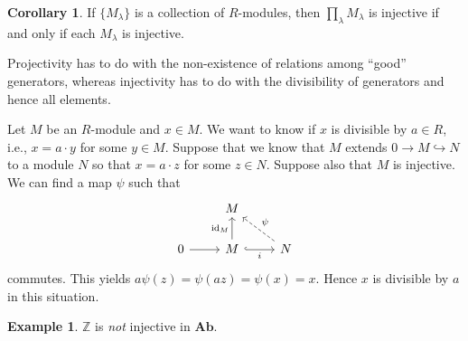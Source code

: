 \documentclass[10pt,letterpaper,cm]{nupset}
\theoremstyle{definition}
\newtheorem{exmp}[definition]{Example}
\theoremstyle{theorem}
\newtheorem{corollary}[definition]{Corollary}
\theoremstyle{remark}
\newcommand{\Z}{\mathbb Z}
\newcommand{\1}{\mathbf{1}}
\newcommand{\0}{\vec 0}
\DeclareMathOperator{\id}{\mathrm{id}}
\begin{document}
\begin{corollary}
If $\{M_{\lambda}\}$ is a collection of $R$-modules, then $\prod_{\lambda} M_{\lambda}$ is injective  if and only if each $M_{\lambda}$ is injective. 
\end{corollary}

\smallskip


Projectivity has to do with the non-existence of relations among ``good'' generators, whereas injectivity has to do with the divisibility of generators and hence all elements.

Let $M$ be an $R$-module and $x\in M$. We want to know if $x$ is divisible by $a\in R$, i.e., $x = a \cdot y$ for some $y\in M$. Suppose that we know that $M$ extends $0 \to M \hookrightarrow N$ to a module $N$ so that $x = a \cdot z$ for some $z \in N$. Suppose also that $M$ is injective. We can find  a map $\psi$ such that 
\[
\begin{tikzcd}
 & M &  \\
0 \arrow[r] & M \arrow[r, "i"', hook] \arrow[u, "\id_M"] & N \arrow[lu, "\psi"', dashed]
\end{tikzcd}
\] commutes. This yields $a\psi(z) = \psi(az) = \psi(x) = x$. Hence $x$ is divisible by $a$ in this situation.


\begin{exmp}
$\Z$ is \emph{not} injective in $\mathbf{Ab}$.
\end{exmp}
\end{document}
